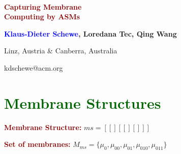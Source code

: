 \documentclass[12pt,landscape]{article}
\begin{document}
\ \vfill

\begin{center}

\textcolor{DarkRed}{\textbf{\gigantisch Capturing Membrane\\[1ex] Computing by ASMs}}

\vspace*{2cm}

{\LARGE\textbf{\textcolor{Blue}{Klaus-Dieter Schewe}, Loredana Tec, Qing Wang}}

\vspace*{1.25cm}

{\large Linz, Austria \& Canberra, Australia}

\vspace*{0.5cm}

{\large kdschewe@acm.org}

\end{center}

\pagecolor{backg}

\vfill\vfill

\newpage
\section*{\centering\textcolor{DarkGreen}{\notsogigantisch Membrane Structures}}

\vfill

\LARGE

\textcolor{DarkRed}{\textbf{Membrane Structure:}} $ms = [[][[][]]]$

\vfill

\textcolor{DarkRed}{\textbf{Set of membranes:}} $M_{ms} = \{ \mu_0, \mu_{00}, \mu_{01}, \mu_{010}, \mu_{011} \}$

\vfill
\end{document}
